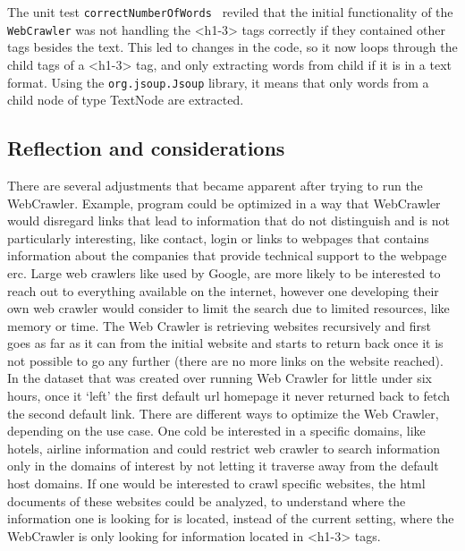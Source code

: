 The unit test {\tt correctNumberOfWords } reviled that the initial functionality of the {\tt WebCrawler} was not handling the <h1-3> tags correctly if they contained other tags besides the text. This led to changes in the code, so it now loops through the child tags of a <h1-3> tag, and only extracting words from child if it is in a text format. Using the {\tt org.jsoup.Jsoup} library, it means that only words from a child node of type TextNode are extracted.


\subsection{Reflection and considerations}
There are several adjustments that became apparent after trying to run the WebCrawler. Example, program could be optimized in a way that WebCrawler would disregard links that lead to information that do not distinguish and is not particularly interesting, like contact, login or links to webpages that contains information about the companies that provide technical support to the webpage erc.  
Large web crawlers like used by Google, are more likely to be interested to reach out to everything available on the internet, however one developing their own web crawler would consider to limit the search due to limited resources, like memory or time. The Web Crawler is retrieving websites recursively and first goes as far as it can from the initial website and starts to return back once it is not possible to go any further (there are no more links on the website reached). In the dataset that was created over running Web Crawler for little under six hours, once it ‘left’ the first default url homepage it never returned back to fetch the second default link. 
There are different ways to optimize the Web Crawler, depending on the use case. One cold be interested in a specific domains, like hotels, airline information and could restrict web crawler to search information only in the domains of interest by not letting it traverse away from the default host domains.
If one would be interested to crawl specific websites, the html documents of these websites could be analyzed, to understand where the information one is looking for is located, instead of the current setting, where the WebCrawler is only looking for information located in <h1-3> tags. 


